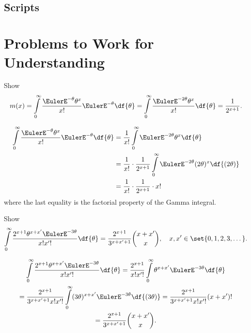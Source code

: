 \documentclass[12pt]{article}
\begin{document}
\subsection*{Scripts}



\hr

\section*{Problems to Work for Understanding}

\renewcommand{\theexerciseseries}{}
\renewcommand{\theexercise}{\arabic{exercise}}

\begin{exercise}
    Show
    \[
        m(x) = \int\limits_0^{\infty} \frac{\EulerE^{-\theta} \theta^x}{x!}
        \EulerE^{-\theta} \df{\theta} = \int\limits_0^{\infty} \frac{\EulerE^
        {-2\theta} \theta^x}{x!} \df{\theta} = \frac{1}{2^{x+1}}.
    \]
\end{exercise}
\begin{solution}
    \begin{align*}
        \int\limits_0^{\infty} \frac{\EulerE^{-\theta} \theta^x}{x!}
        \EulerE^{-\theta} \df{\theta} &= \frac{1}{x!} \int\limits_0^{\infty}
        \EulerE^{-2\theta} \theta^x \df{\theta} \\
        &= \frac{1}{x!} \cdot \frac{1}{2^{x+1}}\int\limits_0^{\infty}
        \EulerE^{-2\theta} (2\theta)^x \df{(2\theta)} \\
        &= \frac{1}{x!} \cdot \frac{1}{2^{x+1}} \cdot x!
    \end{align*}
    where the last equality is the factorial property of the Gamma
    integral.
\end{solution}

\begin{exercise}
    Show
    \[
        \int\limits_0^{\infty}\frac{2^{x+1} \theta^{x+x'} \EulerE^{-3\theta}}
        {x!x'!} \df{\theta} = \frac{2^{x+1}}{3^{x+x'+1}} \binom{x+x'}{x},
        \quad x,x' \in \set{0,1,2,3,\dots}.
    \]
\end{exercise}
\begin{solution}
    \begin{multline*}
        \int\limits_0^{\infty}\frac{2^{x+1} \theta^{x+x'} \EulerE^{-3\theta}}
        {x!x'!} \df{\theta} = \frac{2^{x+1}}{x!  x'!} \int\limits_0^{\infty}
        \theta^{x+x'} \EulerE^{-3\theta} \df{\theta} \\
        = \frac{2^{x+1}}{3^{x+x'+1} x!  x'!} \int\limits_0^{\infty} (3\theta)^
        {x+x'} \EulerE^{-3\theta} \df{(3\theta)} = \frac{2^{x+1}}{3^{x+x'+1}
        x!  x'!} (x + x')!  \\
        = \frac{2^{x+1}}{3^{x+x'+1}} \binom{x+x'}{x}.
    \end{multline*}
\end{solution}
\end{document}
